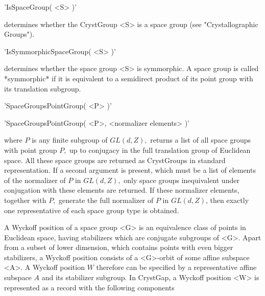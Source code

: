 
'IsSpaceGroup( <S> )'

determines   whether   the  CrystGroup   <S>  is   a  space  group   (see
"Crystallographic Groups").


'IsSymmorphicSpaceGroup( <S> )'

determines whether the space  group <S> is  symmorphic.  A space group is
called *symmorphic* if it  is equivalent to a  semidirect product  of its
point group with its translation subgroup.



'SpaceGroupsPointGroup( <P> )'

'SpaceGroupsPointGroup( <P>, <normalizer elements> )'

where $P$  is any finite   subgroup of $GL(d,Z),$  returns  a list of all
space groups  with   point  group  $P,$ up   to  conjugacy in  the   full
translation group of Euclidean space. All these space groups are returned
as  CrystGroups  in standard  representation.   If a  second  argument is
present,  which must be a  list of elements of the  normalizer  of $P$ in
$GL(d,Z),$ only space  groups  inequivalent under conjugation with  these
elements are returned.  If  these normalizer elements, together with $P,$
generate  the full  normalizer  of $P$  in  $GL(d,Z)$,  then  exactly one
representative of each space group type is obtained.

%
%

A  Wyckoff position  of  a space group  <G>  is an equivalence   class of
points in  Euclidean  space,  having  stabilizers  which  are   conjugate
subgroups of <G>.  Apart from a subset of lower dimension, which contains
points with  even bigger  stabilizers, a Wyckoff   position consists of a
<G>-orbit of  some affine subspace  <A>. A Wyckoff position $W$ therefore
can  be  specified  by a  representative  affine  subspace  $A$  and  its
stabilizer subgroup. In CrystGap,  a Wyckoff position <W> is  represented 
as a record with the following components\:

